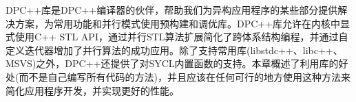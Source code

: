 
DPC++库是DPC++编译器的伙伴，帮助我们为异构应用程序的某些部分提供解决方案，为常用功能和并行模式使用预构建和调优库。DPC++库允许在内核中显式使用C++ STL API，通过并行STL算法扩展简化了跨体系结构编程，并通过自定义迭代器增加了并行算法的成功应用。除了支持常用库(libstdc++、libc++、MSVS)之外，DPC++还提供了对SYCL内置函数的支持。本章概述了利用库的好处(而不是自己编写所有代码的方法)，并且应该在任何可行的地方使用这种方法来简化应用程序开发，并实现更好的性能。\par


\newpage